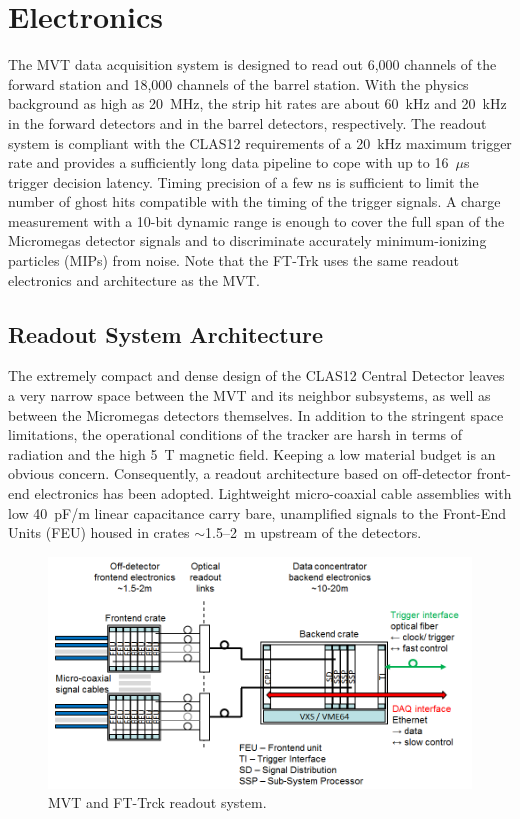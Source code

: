 \section{Electronics}

The MVT data acquisition system is designed to read out 6,000 channels of the forward station and 18,000 channels of the
barrel station. With the physics background as high as 20~MHz, the strip hit rates are about 60~kHz and 20~kHz in the
forward detectors and in the barrel detectors, respectively. The readout system is compliant with the CLAS12 requirements
of a 20~kHz maximum trigger rate and provides a sufficiently long data pipeline to cope with up to 16~$\mu$s trigger decision
latency. Timing precision of a few ns is sufficient to limit the number of ghost hits compatible with the timing of the trigger
signals. A charge measurement with a 10-bit dynamic range is enough to cover the full span of the Micromegas detector signals
and to discriminate accurately minimum-ionizing particles (MIPs) from noise. Note that the FT-Trk uses the same readout electronics and architecture as the MVT.

\subsection{Readout System Architecture}

The extremely compact and dense design of the CLAS12 Central Detector leaves a very narrow space between the MVT and
its neighbor subsystems, as well as between the Micromegas detectors themselves.  In addition to the stringent space limitations, the
operational conditions of the tracker are harsh in terms of radiation and the high 5~T magnetic field. Keeping a low material budget
is an obvious concern. Consequently, a readout architecture based on off-detector front-end electronics has been adopted.
Lightweight micro-coaxial cable assemblies with low 40~pF/m linear capacitance carry bare, unamplified signals to the Front-End
Units (FEU) housed in crates $\sim$1.5--2~m upstream of the detectors. 

\begin{figure}[htb]
\begin{center}
 \includegraphics[width=1.6\columnwidth,keepaspectratio]{images/electronics_fig1.png}
\end{center}

 \caption{MVT and FT-Trck readout system.}
 \label{fig:mm-e_1}
\end{figure}

